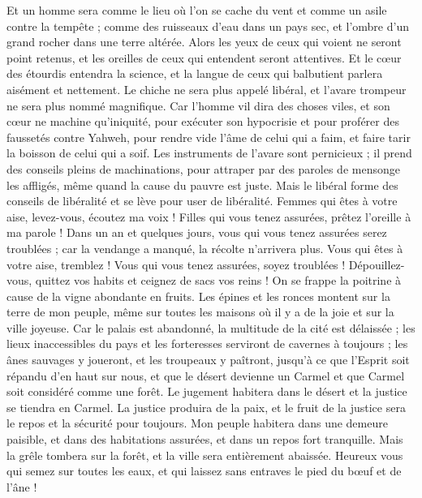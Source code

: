 \begin{multicols}{2}
Et un homme sera comme le lieu où l'on se cache du vent et comme un asile contre la tempête ; comme des ruisseaux d'eau dans un pays sec, et l'ombre d'un grand rocher dans une terre altérée.
Alors les yeux de ceux qui voient ne seront point retenus, et les oreilles de ceux qui entendent seront attentives.
Et le cœur des étourdis entendra la science, et la langue de ceux qui balbutient parlera aisément et nettement.
Le chiche ne sera plus appelé libéral, et l'avare trompeur ne sera plus nommé magnifique.
Car l'homme vil dira des choses viles, et son cœur ne machine qu'iniquité, pour exécuter son hypocrisie et pour proférer des faussetés contre Yahweh, pour rendre vide l'âme de celui qui a faim, et faire tarir la boisson de celui qui a soif.
Les instruments de l'avare sont pernicieux ; il prend des conseils pleins de machinations, pour attraper par des paroles de mensonge les affligés, même quand la cause du pauvre est juste.
Mais le libéral forme des conseils de libéralité et se lève pour user de libéralité.
Femmes qui êtes à votre aise, levez-vous, écoutez ma voix ! Filles qui vous tenez assurées, prêtez l'oreille à ma parole !
Dans un an et quelques jours, vous qui vous tenez assurées serez troublées ; car la vendange a manqué, la récolte n'arrivera plus.
Vous qui êtes à votre aise, tremblez ! Vous qui vous tenez assurées, soyez troublées ! Dépouillez-vous, quittez vos habits et ceignez de sacs vos reins !
On se frappe la poitrine à cause de la vigne abondante en fruits.
Les épines et les ronces montent sur la terre de mon peuple, même sur toutes les maisons où il y a de la joie et sur la ville joyeuse.
Car le palais est abandonné, la multitude de la cité est délaissée ; les lieux inaccessibles du pays et les forteresses serviront de cavernes à toujours ; les ânes sauvages y joueront, et les troupeaux y paîtront,
jusqu'à ce que l'Esprit soit répandu d'en haut sur nous, et que le désert devienne un Carmel et que Carmel soit considéré comme une forêt.
Le jugement habitera dans le désert et la justice se tiendra en Carmel.
La justice produira de la paix, et le fruit de la justice sera le repos et la sécurité pour toujours.
Mon peuple habitera dans une demeure paisible, et dans des habitations assurées, et dans un repos fort tranquille.
Mais la grêle tombera sur la forêt, et la ville sera entièrement abaissée.
Heureux vous qui semez sur toutes les eaux, et qui laissez sans entraves le pied du bœuf et de l'âne !

\end{multicols}
